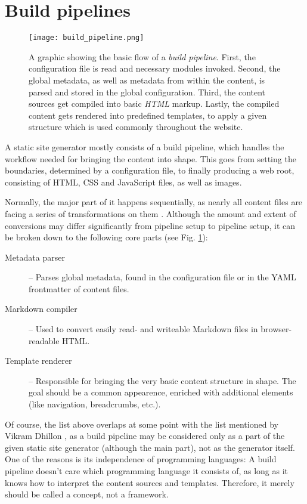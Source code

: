 \section{Build pipelines}
\label{sec:buildpipelines}

\begin{figure} %
    \centering
    \texttt{[image: build\_pipeline.png]}
    \caption{A graphic showing the basic flow of a \emph{build pipeline}. First, the configuration file is read and necessary modules invoked. Second, the global metadata, as well as metadata from within the content, is parsed and stored in the global configuration. Third, the content sources get compiled into basic \emph{HTML} markup. Lastly, the compiled content gets rendered into predefined templates, to apply a given structure which is used commonly throughout the website.}
    \label{fig:build-pipeline}
\end{figure}
%

A static site generator mostly consists of a build pipeline, which handles the workflow needed for bringing the content into shape. This goes from setting the boundaries, determined by a configuration file, to finally producing a web root, consisting of HTML, CSS and JavaScript files, as well as images.

Normally, the major part of it happens sequentially, as nearly all content files are facing a series of transformations on them \cite{Metalsmith2015technicaldocumentation}. Although the amount and extent of conversions may differ significantly from pipeline setup to pipeline setup, it can be broken down to the following core parts (see Fig. \ref{fig:build-pipeline}):

\begin{description}
  \item[Metadata parser] -- Parses global metadata, found in the configuration file or in the YAML frontmatter of content files.
  \item[Markdown compiler] -- Used to convert easily read- and writeable Markdown files in browser-readable HTML.
  \item[Template renderer] -- Responsible for bringing the very basic content structure in shape. The goal should be a common appearence, enriched with additional elements (like navigation, breadcrumbs, etc.).
\end{description}
Of course, the list above overlaps at some point with the list mentioned by Vikram Dhillon \cite[24]{dhillon2016}, as a build pipeline may be considered only as a part of the given static site generator (although the main part), not as the generator itself. One of the reasons is its independence of programming languages: A build pipeline doesn't care which programming language it consists of, as long as it knows how to interpret the content sources and templates. Therefore, it merely should be called a concept, not a framework.


